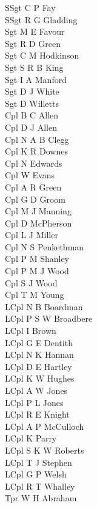 \begin{multicols}{4}
  \scriptsize
  \noindent
  SSgt C P Fay \\
  SSgt R G Gladding \\
  Sgt M E Favour \\
  Sgt R D Green \\
  Sgt C M Hodkinson \\
  Sgt S R B King \\
  Sgt I A Manford \\
  Sgt D J White \\
  Sgt D Willetts \\
  Cpl B C Allen \\
  Cpl D J Allen \\
  Cpl N A B Clegg \\
  Cpl K R Downes \\
  Cpl N  Edwards \\
  Cpl W Evans \\
  Cpl A R Green \\
  Cpl G D Groom \\
  Cpl M J Manning \\
  Cpl D McPherson \\
  Cpl L J Miller \\
  Cpl N S Penkethman \\
  Cpl P M Shanley \\
  Cpl P M J Wood \\
  Cpl S J Wood \\
  Cpl T M Young \\
  LCpl N B Boardman \\
  LCpl P S W Broadbere \\
  LCpl I Brown \\
  LCpl G E Dentith \\
  LCpl N K Hannan \\
  LCpl D E Hartley \\
  LCpl K W Hughes \\
  LCpl A W Jones \\
  LCpl P L Jones \\
  LCpl R E Knight \\
  LCpl A P McCulloch \\
  LCpl K Parry \\
  LCpl S K W Roberts \\
  LCpl T J Stephen \\
  LCpl G P Welsh \\
  LCpl R T Whalley \\
  Tpr W H Abraham \\

\end{multicols}
